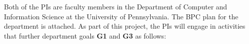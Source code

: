 




Both of the PIs are faculty members in the Department of Computer and Information
Science at the University of Pennsylvania. The BPC plan for the department is
attached. As part of this project, the PIs will engage in activities that
further department goals \textbf{G1} and \textbf{G3} as follows:

